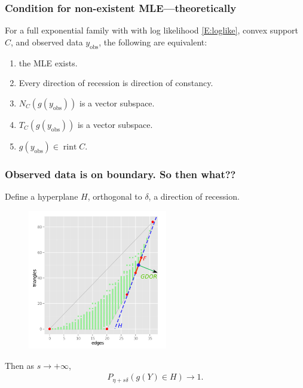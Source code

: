 \documentclass[slidestop,compress, 10pt]{beamer}
\DeclareMathOperator{\rint}{rint}
\newcommand{\yobs}{y_{\text{obs}}}
\begin{document}
\frame
{
  \frametitle{Condition for non-existent MLE---theoretically}  
\begin{theorem}
For a full exponential family with with log likelihood \eqref{E:loglike}, convex support $C$, and observed data $\yobs$, the following are equivalent:
\begin{enumerate}
\item the MLE exists.
\item Every direction of recession is direction of constancy.
\item $N_C(g(\yobs))$ is a vector subspace.
\item $T_C(g(\yobs))$ is a vector subspace.
\item $g(\yobs) \in \rint C$.
\end{enumerate}
\end{theorem}
}

\frame
{
	\frametitle{Observed data is on boundary.  So then what??}

Define a hyperplane $H$, orthogonal to $\delta$, a direction of recession.
\begin{figure}[h]
\centering
\includegraphics[height=2.4in]{g9-H.png}
\end{figure}
Then as $s \to +\infty$,
\begin{align*}
		P_{\eta + s \delta}( g(Y) \in H) \to 1.
\end{align*}
}
\end{document}
